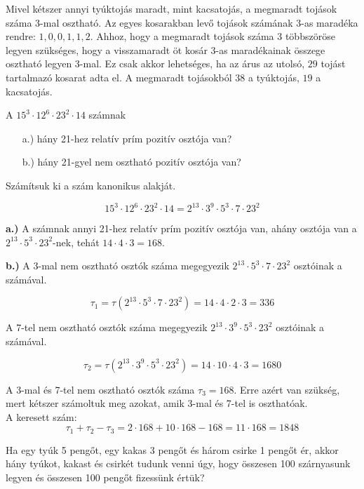 \begin{solution}
Mivel kétszer annyi tyúktojás maradt, mint kacsatojás, a megmaradt
tojások száma $3$-mal osztható. Az egyes kosarakban levő tojások
számának $3$-as maradéka rendre: $1,0,0,1,1,2$. Ahhoz, hogy a megmaradt
tojások száma $3$ többszöröse legyen szükséges, hogy a visszamaradt
öt kosár $3$-as maradékainak összege osztható legyen $3$-mal. Ez
csak akkor lehetséges, ha az árus az utolsó, $29$ tojást tartalmazó
kosarat adta el. A megmaradt tojásokból $38$ a tyúktojás, $19$ a
kacsatojás. 
\end{solution}
\begin{extraproblem}
A $15^{3}\cdot12^{6}\cdot23^{2}\cdot14$ számnak 
\begin{itemize}
\item[a.)] hány 21-hez relatív prím pozitív osztója van? 
\item[b.)] hány 21-gyel nem osztható pozitív osztója van? 
\end{itemize}
\end{extraproblem}

\begin{solution}
Számítsuk ki a szám kanonikus alakját.

\[
15^{3}\cdot12^{6}\cdot23^{2}\cdot14=2^{13}\cdot3^{9}\cdot5^{3}\cdot7\cdot23^{2}
\]

\textbf{a.)} A számnak annyi 21-hez relatív prím pozitív osztója van,
ahány osztója van a $2^{13}\cdot5^{3}\cdot23^{2}$-nek, tehát $14\cdot4\cdot3=168$.

\textbf{b.)} A 3-mal nem osztható osztók száma megegyezik $2^{13}\cdot5^{3}\cdot7\cdot23^{2}$
osztóinak a számával.

\[
\tau_{1}=\tau(2^{13}\cdot5^{3}\cdot7\cdot23^{2})=14\cdot4\cdot2\cdot3=336
\]

A 7-tel nem osztható osztók száma megegyezik $2^{13}\cdot3^{9}\cdot5^{3}\cdot23^{2}$
osztóinak a számával.

\[
\tau_{2}=\tau(2^{13}\cdot3^{9}\cdot5^{3}\cdot23^{2})=14\cdot10\cdot4\cdot3=1680
\]

A 3-mal és 7-tel nem osztható osztók száma $\tau_{3}=168$. Erre azért
van szükség, mert kétszer számoltuk meg azokat, amik 3-mal és 7-tel
is oszthatóak. \\
A keresett szám: 
\[
\tau_{1}+\tau_{2}-\tau_{3}=2\cdot168+10\cdot168-168=11\cdot168=1848
\]
\end{solution}
\begin{extraproblem}
Ha egy tyúk 5 pengőt, egy kakas 3 pengőt és három csirke 1 pengőt
ér, akkor hány tyúkot, kakast és csirkét tudunk venni úgy, hogy összesen
100 szárnyasunk legyen és összesen 100 pengőt fizessünk értük? 
\end{extraproblem}

